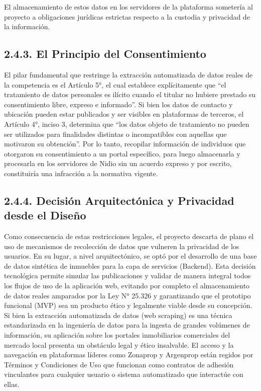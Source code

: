 El almacenamiento de estos datos en los servidores de la plataforma sometería al proyecto a obligaciones jurídicas estrictas respecto a la custodia y privacidad de la información.

\subsection{2.4.3. El Principio del Consentimiento}

El pilar fundamental que restringe la extracción automatizada de datos reales de la competencia es el Artículo 5°, el cual establece explícitamente que ``el tratamiento de datos personales es ilícito cuando el titular no hubiere prestado su consentimiento libre, expreso e informado''. Si bien los datos de contacto y ubicación pueden estar publicados y ser visibles en plataformas de terceros, el Artículo 4°, inciso 3, determina que ``los datos objeto de tratamiento no pueden ser utilizados para finalidades distintas o incompatibles con aquellas que motivaron su obtención''. Por lo tanto, recopilar información de individuos que otorgaron su consentimiento a un portal específico, para luego almacenarla y procesarla en los servidores de Nidio sin un acuerdo expreso y por escrito, constituiría una infracción a la normativa vigente.

\subsection{2.4.4. Decisión Arquitectónica y Privacidad desde el Diseño}

Como consecuencia de estas restricciones legales, el proyecto descarta de plano el uso de mecanismos de recolección de datos que vulneren la privacidad de los usuarios. En su lugar, a nivel arquitectónico, se optó por el desarrollo de una base de datos sintética de inmuebles para la capa de servicios (Backend). Esta decisión tecnológica permite simular las publicaciones y validar de manera integral todos los flujos de uso de la aplicación web, evitando por completo el almacenamiento de datos reales amparados por la Ley N° 25.326 y garantizando que el prototipo funcional (MVP) sea un producto ético y legalmente viable desde su concepción. Si bien la extracción automatizada de datos (web scraping) es una técnica estandarizada en la ingeniería de datos para la ingesta de grandes volúmenes de información, su aplicación sobre los portales inmobiliarios comerciales del mercado local presenta un obstáculo legal y ético insalvable. El acceso y la navegación en plataformas líderes como Zonaprop y Argenprop están regidos por Términos y Condiciones de Uso que funcionan como contratos de adhesión vinculantes para cualquier usuario o sistema automatizado que interactúe con ellas.

